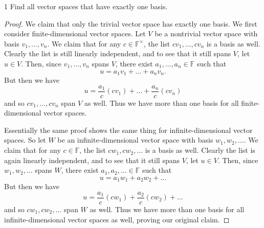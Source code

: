 \documentclass[11pt]{extarticle}
\newenvironment{problem}[1]{\begin{prob*}{#1}{}}{\end{prob*}}
\newcommand{\F}{\mathbb{F}}
\begin{document}
\begin{problem}{1}
Find all vector spaces that have exactly one basis.
\end{problem}
\begin{proof}
We claim that only the trivial vector space has exactly one basis.  We first consider finite-dimensional vector spaces.  Let $V$ be a nontrivial vector space with basis $v_1,\dots, v_n$.  We claim that for any $c\in\F^\times$, the list $cv_1, \dots, cv_n$ is a basis as well.  Clearly the list is still linearly independent, and to see that it still spans $V$, let $u\in V$.  Then, since $v_1,\dots, v_n$ spans $V$, there exist $a_1,\dots, a_n\in\F$ such that 
\begin{equation*}
u = a_1v_1 + \dots + a_nv_n.
\end{equation*}  
But then we have
\begin{equation*}
u = \frac{a_1}{c}(cv_1) + \dots + \frac{a_n}{c}(cv_n)
\end{equation*}
and so $cv_1,\dots,cv_n$ span $V$ as well.  Thus we have more than one basis for all finite-dimensional vector spaces.
\par Essentially the same proof shows the same thing for infinite-dimensional vector spaces.  So let $W$ be an infinite-dimensional vector space with basis $w_1,w_2,\dots$.  We claim that for any $c\in\F$, the list $cw_1,cw_2,\dots$ is a basis as well.  Clearly the list is again linearly independent, and to see that it still spans $V$, let $u\in V$.  Then, since $w_1,w_2,\dots$ spans $W$, there exist $a_1, a_2,\dots \in \F$ such that
\begin{equation*}
u = a_1w_1 + a_2w_2 + \dots
\end{equation*}
But then we have
\begin{equation*}
u = \frac{a_1}{c}(cw_1) + \frac{a_2}{c}(cw_2) + \dots
\end{equation*}
and so $cw_1, cw_2,\dots$ span $W$ as well.  Thus we have more than one basis for all infinite-dimensional vector spaces as well, proving our original claim.
\end{proof}
\end{document}
